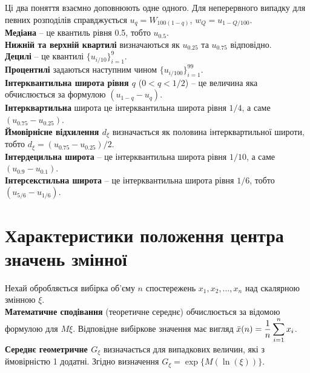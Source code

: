 Ці два поняття взаємно доповнюють одне одного. Для неперервного випадку для певних розподілів справджується $u_q = W_{100 (1 - q)}$, $w_Q = u_{1 - Q / 100}$. \\

\textbf{Медіана} -- це квантиль рівня 0.5, тобто $u_{0.5}$. \\

\textbf{Нижній та верхній квартилі} визначаються як $u_{0.25}$ та $u_{0.75}$ відповідно. \\

\textbf{Децилі} -- це квантилі $\{ u_{i/10} \}_{i=1}^9$. \\

\textbf{Процентилі} задаються наступним чином $\{ u_{i/100} \}_{i=1}^{99}$. \\

\textbf{Інтерквантильна широта рівня $q$} ($0 < q < 1 /2$) -- це величина яка обчислюється за формулою $(u_{1 - q} - u_q)$. \\

\textbf{Інтерквартильна} широта це інтерквантильна широта рівня $1/4$, а саме $(u_{0.75} - u_{0.25})$. \\

\textbf{Ймовірнісне відхилення $d_\xi$} визначається як половина інтерквартильної широти, тобто $d_\xi = (u_{0.75} - u_{0.25}) / 2$. \\

\textbf{Інтердецильна широта} -- це інтерквантильна широта рівня $1 / 10$, а саме $(u_{0.9} - u_{0.1})$. \\

\textbf{Інтерсекстильна широта} -- це інтерквантильна широта рівня $1 / 6$, тобто $(u_{5/6} - u_{1/6})$.

\section{Характеристики положення центра значень змінної}

Нехай обробляється вибірка об'єму $n$ спостережень $x_1, x_2, \ldots, x_n$ над скалярною змінною $\xi$. \\

\textbf{Математичне сподівання} (теоретичне середнє) обчислюється за відомою формулою для $M \xi$. Відповідне вибіркове значення має вигляд $\bar{x}(n)= \dfrac{1}{n} \displaystyle\sum\limits_{i=1}^n x_i$. \\

\textbf{Середнє геометричне $G_\xi$} визначається для випадкових величин, які з ймовірністю 1 додатні. Згідно визначення $G_\xi = \exp\{M (\ln (\xi))\}$. \\

